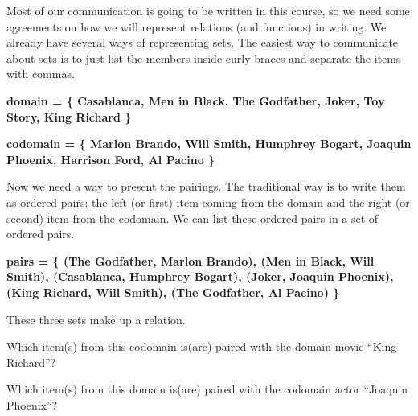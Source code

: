 \documentclass{ximera}
\begin{document}
\hfill\break

Most of our communication is going to be written in this course, so we need some agreements on how we will represent relations (and functions) in writing.  We already have several ways of representing sets.  The easiest way to communicate about sets is to just list the members inside curly braces and separate the items with commas.

\begin{center} 
\textbf{\textcolor{blue!75!black}{ domain = \{ Casablanca, Men in Black,  The Godfather, Joker, Toy Story, King Richard \} }}
\end{center}

\begin{center} 
\textbf{\textcolor{blue!75!black}{ codomain = \{ Marlon Brando, Will Smith, Humphrey Bogart, Joaquin Phoenix, Harrison Ford, Al Pacino \} }}
\end{center}

Now we need a way to present the pairings.  The traditional way is to write them as ordered pairs: the left (or first) item coming from the domain and the right (or second) item from the codomain.  We can list these ordered pairs in a set of ordered pairs. 

\begin{center} 
\textbf{\textcolor{blue!75!black}{ pairs = \{ (The Godfather, Marlon Brando), (Men in Black, Will Smith), (Casablanca, Humphrey Bogart), (Joker, Joaquin Phoenix), (King Richard, Will Smith), (The Godfather, Al Pacino) \}  }}
\end{center}


These three sets make up a relation. 



\begin{question}

Which item(s) from this codomain is(are) paired with the domain movie ``King Richard''?
\begin{selectAll}
\end{selectAll}

\end{question}








\newpage

\begin{question}

Which item(s) from this domain is(are) paired with the codomain actor ``Joaquin Phoenix''?
\begin{selectAll}
\end{selectAll}

\end{question}
\end{document}
